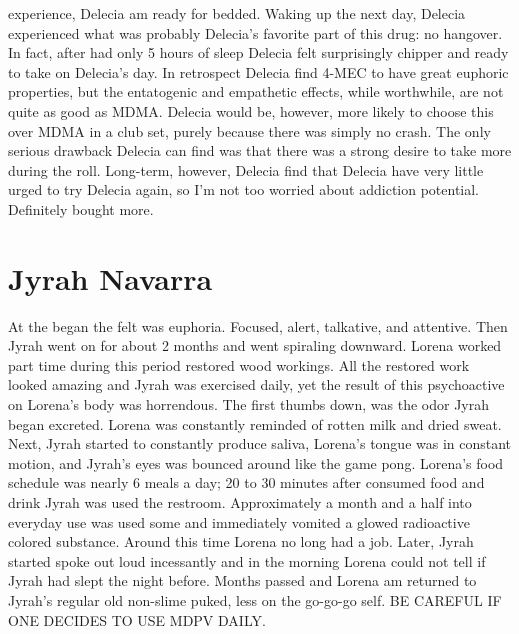 \documentclass[12pt]{book}
\begin{document}
experience, Delecia am ready for bedded. Waking up the next day, Delecia experienced what was probably Delecia's favorite part of this drug: no hangover. In fact, after had only 5 hours of sleep Delecia felt surprisingly chipper and ready to take on Delecia's day. In retrospect Delecia find 4-MEC to have great euphoric properties, but the entatogenic and empathetic effects, while worthwhile, are not quite as good as MDMA. Delecia would be, however, more likely to choose this over MDMA in a club set, purely because there was simply no crash. The only serious drawback Delecia can find was that there was a strong desire to take more during the roll. Long-term, however, Delecia find that Delecia have very little urged to try Delecia again, so I'm not too worried about addiction potential. Definitely bought more.



\chapter{Jyrah Navarra}

At the began the felt was euphoria. Focused, alert, talkative, and attentive. Then Jyrah went on for about 2 months and went spiraling downward. Lorena worked part time during this period restored wood workings. All the restored work looked amazing and Jyrah was exercised daily, yet the result of this psychoactive on Lorena's body was horrendous. The first thumbs down, was the odor Jyrah began excreted. Lorena was constantly reminded of rotten milk and dried sweat. Next, Jyrah started to constantly produce saliva, Lorena's tongue was in constant motion, and Jyrah's eyes was bounced around like the game pong. Lorena's food schedule was nearly 6 meals a day; 20 to 30 minutes after consumed food and drink Jyrah was used the restroom. Approximately a month and a half into everyday use was used some and immediately vomited a glowed radioactive colored substance. Around this time Lorena no long had a job. Later, Jyrah started spoke out loud incessantly and in the morning Lorena could not tell if Jyrah had slept the night before. Months passed and Lorena am returned to Jyrah's regular old non-slime puked, less on the go-go-go self. BE CAREFUL IF ONE DECIDES TO USE MDPV DAILY.
\end{document}
